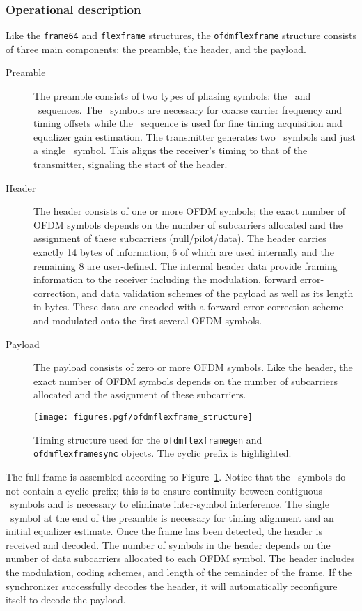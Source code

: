 \subsubsection{Operational description}
\label{module:framing:ofdmflexframe:operation}
Like the {\tt frame64} and {\tt flexframe} structures,
the {\tt ofdmflexframe} structure consists of three main components:
the preamble, the header, and the payload.
%    
\begin{description}
\item[Preamble]
    The preamble consists of two types of phasing symbols: the \Ss\ and
    \Sl\ sequences.
    The \Ss\ symbols are necessary for coarse carrier frequency
    and timing offsets while the \Sl\ sequence is used for fine timing
    acquisition and equalizer gain estimation.  The transmitter
    generates two \Ss\ symbols and just a single \Sl\ symbol.
    This aligns the receiver's timing to
    that of the transmitter, signaling the start of the header.
\item[Header]
    The header consists of one or more OFDM symbols; the exact number of
    OFDM symbols depends on the number of subcarriers allocated and the
    assignment of these subcarriers (null/pilot/data). The header
    carries exactly 14 bytes of information, 6 of which are used
    internally and the remaining 8 are user-defined.
    The internal header data provide framing information to the receiver
    including the modulation, forward error-correction, and
    data validation schemes of the payload as well as its length in
    bytes. These data are encoded with a forward error-correction scheme
    and modulated onto the first several OFDM symbols.
\item[Payload]
    The payload consists of zero or more OFDM symbols. Like the header,
    the exact number of OFDM symbols depends on the number of
    subcarriers allocated and the assignment of these subcarriers.
\end{description}
%
% 
%
\begin{figure}
\centering
  \texttt{[image: figures.pgf/ofdmflexframe\_structure]}
\caption{
    Timing structure used for the {\tt ofdmflexframegen} and
    {\tt ofdmflexframesync} objects.
    The cyclic prefix is highlighted.}
\label{fig:module:framing:ofdmflexframe_structure}
\end{figure}
%
The full frame is assembled according to
Figure~\ref{fig:module:framing:ofdmflexframe_structure}.
Notice that the \Ss\ symbols do not contain a cyclic prefix;
this is to ensure continuity between contiguous \Ss\ symbols and is
necessary to eliminate inter-symbol interference.
The single \Sl\ symbol at the end of the preamble is necessary for
timing alignment and an initial equalizer estimate.
Once the frame has been detected, the header is received and decoded.
The number of symbols in the header depends on the number of data
subcarriers allocated to each OFDM symbol.
The header includes the modulation, coding schemes, and length of the
remainder of the frame.
If the synchronizer successfully decodes the header, it will
automatically reconfigure itself to decode the payload.

